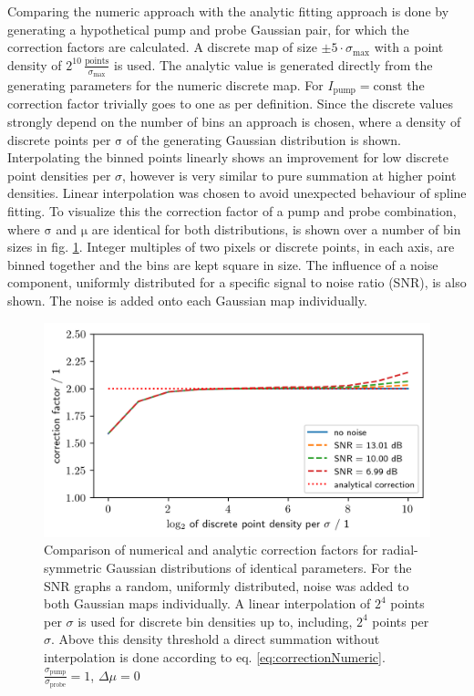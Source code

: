\documentclass[twoside,openright,listof=numbered]{scrreprt}
\begin{document}
Comparing the numeric approach with the analytic fitting approach is done by generating a hypothetical pump and probe Gaussian pair, for which the correction factors are calculated. A discrete map of size $\pm 5\cdot \sigma_\text{max}$ with a point density of $2^{10}\, \frac{\text{points}}{\sigma_\text{max}}$ is used. The analytic value is generated directly from the generating parameters for the numeric discrete map. For $I_\text{pump} = \text{const}$ the correction factor trivially goes to one as per definition. Since the discrete values strongly depend on the number of bins an approach is chosen, where a density of discrete points per $\mathrm{\sigma}$ of the generating Gaussian distribution is shown. Interpolating the binned points linearly shows an improvement for low discrete point densities per $\sigma$, however is very similar to pure summation at higher point densities. Linear interpolation was chosen to avoid unexpected behaviour of spline fitting. To visualize this the correction factor of a pump and probe combination, where $\mathrm{\sigma}$ and $\mathrm{\mu}$ are identical for both distributions, is shown over a number of bin sizes in fig. \ref{fig:NumericalCorrectionSNR}. Integer multiples of two pixels or discrete points, in each axis, are binned together and the bins are kept square in size. The influence of a noise component, uniformly distributed for a specific signal to noise ratio (SNR), is also shown. The noise is added onto each Gaussian map individually.

\begin{figure}[h]
\centering
\includegraphics[scale = 1]{images/NumericalCorrectionSNR_interpolation.png}
\caption[Comparison of numerical and analytic correction factors for radial-symmetric Gaussian distributions of identical parameters.]{Comparison of numerical and analytic correction factors for radial-symmetric Gaussian distributions of identical parameters. For the SNR graphs a random, uniformly distributed, noise was added to both Gaussian maps individually. A linear interpolation of $2^4$ points per $\sigma$ is used for discrete bin densities up to, including, $2^4$ points per $\sigma$. Above this density threshold a direct summation without interpolation is done according to eq. \ref{eq:correctionNumeric}.\\$\frac{\sigma_\text{pump}}{\sigma_\text{probe}}=1$, $\Delta\mu = 0$\\\label{fig:NumericalCorrectionSNR}}
\end{figure}
\end{document}
